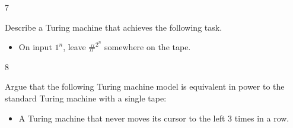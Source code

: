 \documentclass[12pt]{article}
\begin{document}
\begin{problem}{7}

    Describe a Turing machine that achieves the following task.
    \begin{itemize}
        \item On input $1^n$, leave $\#^{2^n}$ somewhere on the tape.
    \end{itemize}
\end{problem}

\begin{solution}
    \bbni

\end{solution}

\begin{problem}{8}

    Argue that the following Turing machine model is equivalent in power to the standard Turing machine with a single tape:
    \begin{itemize}
        \item A Turing machine that never moves its cursor to the left $3$ times in a row.
    \end{itemize}
\end{problem}

\begin{solution}
    \bbni
    
\end{solution}
\end{document}
